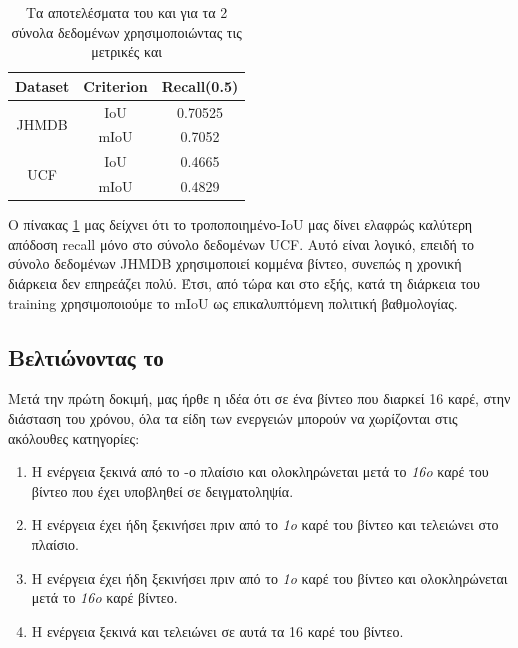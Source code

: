 \en
\begin{table}[h]
  \centering
  \begin{tabular}{|| c | c || c ||}
    \hline
    \textbf{Dataset} & \textbf{Criterion} & \textbf{Recall(0.5)} \\
    \hline  \hline
    \multirow{2}{4em}{JHMDB} & IoU & 0.70525 \\
    \cline{2-3}
    {} & mIoU & 0.7052 \\
    \hline
    \multirow{2}{4em}{UCF} & IoU & 0.4665 \\
    \cline{2-3}
    {} & mIoU & 0.4829 \\
    \hline      
  \end{tabular}
  \caption{\gr Τα αποτελέσματα του  και για τα 2 σύνολα δεδομένων
    χρησιμοποιώντας τις μετρικές  και }

  \label{table:gr_iou_miou}
\end{table}
\gr

Ο πίνακας  \ref{table:gr_iou_miou} μας δείχνει ότι το τροποποιημένο-\en IoU \gr μας δίνει ελαφρώς καλύτερη απόδοση \en recall \gr μόνο στο σύνολο δεδομένων \en UCF\gr.
Αυτό είναι λογικό, επειδή το σύνολο δεδομένων \en JHMDB \gr χρησιμοποιεί κομμένα βίντεο, συνεπώς  η χρονική διάρκεια δεν επηρεάζει πολύ. Έτσι, από τώρα και στο εξής,
κατά τη διάρκεια του \en training \gr χρησιμοποιούμε το \en mIoU  \gr ως επικαλυπτόμενη πολιτική βαθμολογίας.

\subsection{Βελτιώνοντας το  }
\gr Μετά την πρώτη δοκιμή, μας ήρθε η  ιδέα ότι σε ένα βίντεο που διαρκεί 16 καρέ, στην διάσταση του χρόνου, όλα τα είδη των ενεργειών μπορούν να χωρίζονται στις ακόλουθες κατηγορίες:
\begin{enumerate}
\item Η ενέργεια ξεκινά από το -ο πλαίσιο και ολοκληρώνεται μετά το \textit{16o} καρέ του βίντεο που έχει υποβληθεί σε δειγματοληψία.
\item Η ενέργεια έχει ήδη ξεκινήσει πριν από το \textit{1o} καρέ του βίντεο και τελειώνει στο  πλαίσιο.
\item Η ενέργεια έχει ήδη ξεκινήσει πριν από το \textit{1o} καρέ του βίντεο και ολοκληρώνεται μετά το \textit{16o} καρέ βίντεο.
\item Η ενέργεια ξεκινά και τελειώνει σε αυτά τα 16 καρέ του βίντεο.
\end{enumerate}

